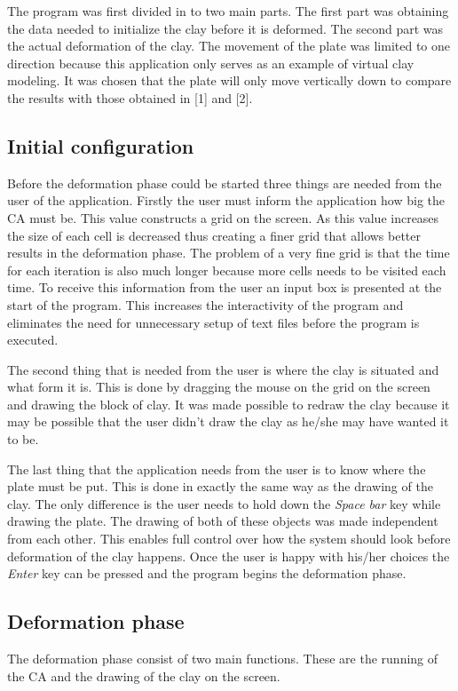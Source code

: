 \documentclass[a4paper,11pt,titlepage]{article}
\begin{document}
The program was first divided in to two main parts. The first part was obtaining the data needed to initialize the clay before it is deformed. The second part was the actual deformation of the clay. The movement of the plate was limited to one direction because this application only serves as an example of virtual clay modeling. It was chosen that the plate will only move vertically down to compare the results with those obtained in [1] and [2].

\subsection{Initial configuration}
Before the deformation phase could be started three things are needed from the user of the application. Firstly the user must inform the application how big the CA must be. This value constructs a grid on the screen. As this value increases the size of each cell is decreased thus creating a finer grid that allows better results in the deformation phase. The problem of a very fine grid is that the time for each iteration is also much longer because more cells needs to be visited each time.
To receive this information from the user an input box is presented at the start of the program. This increases the interactivity of the program and eliminates the need for unnecessary setup of text files before the program is executed.

The second thing that is needed from the user is where the clay is situated and what form it is. This is done by dragging the mouse on the grid on the screen and drawing the block of clay. 
It was made possible to redraw the clay because it may be possible that the user didn't draw the clay as he/she may have wanted it to be.

The last thing that the application needs from the user is to know where the plate must be put. This is done in exactly the same way as the drawing of the clay. The only difference is the user needs to hold down the \emph{Space bar} key while drawing the plate. 
The drawing of both of these objects was made independent from each other. This enables full control over how the system should look before deformation of the clay happens.
Once the user is happy with his/her choices the \emph{Enter} key can be pressed and the program begins the deformation phase.
\subsection{Deformation phase}
The deformation phase consist of two main functions. These are the running of the CA and the drawing of the clay on the screen.
\end{document}
